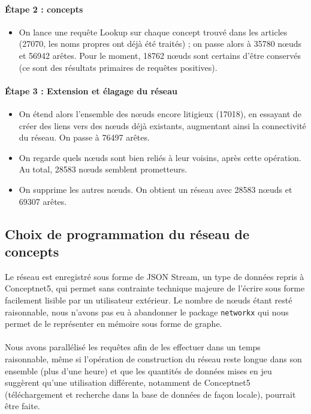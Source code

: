 \documentclass[a4paper, 12pt]{article}
\newcommand{\pyt}[1]{\texttt{#1}}%
\begin{document}
\paragraph{Étape 2 : concepts}

\begin{itemize}
 \item On lance une requête Lookup sur chaque concept trouvé dans les articles (27070, les noms propres ont déjà été traités) ; on passe alors à 35780 n\oe uds et 56942 arêtes. Pour le moment, 18762 n\oe uds sont certains d'être conservés (ce sont des résultats primaires de requêtes positives).
\end{itemize}


\paragraph{Étape 3 : Extension et élagage du réseau}

\begin{itemize}
 \item On étend alors l'ensemble des n\oe uds encore litigieux (17018), en essayant de créer des liens vers des n\oe uds déjà existants, augmentant ainsi la connectivité du réseau. On passe à 76497 arêtes.
 \item On regarde quels n\oe uds sont bien reliés à leur voisins, après cette opération. Au total, 28583 n\oe uds semblent prometteurs.
 \item On supprime les autres n\oe uds. On obtient un réseau avec 28583 n\oe uds et 69307 arêtes.
\end{itemize}



\subsection{Choix de programmation du réseau de concepts}

Le réseau est enregistré sous forme de JSON Stream, un type de données repris à Conceptnet5, qui permet sans contrainte technique majeure de l'écrire sous forme facilement lisible par un utilisateur extérieur. Le nombre de nœuds étant resté raisonnable, nous n'avons pas eu à abandonner le package \pyt{networkx} qui nous permet de le représenter en mémoire sous forme de graphe.

\paragraph{}
Nous avons parallélisé les requêtes afin de les effectuer dans un temps raisonnable, même si l'opération de construction du réseau reste longue dans son ensemble (plus d'une heure) et que les quantités de données mises en jeu suggèrent qu'une utilisation différente, notamment de Conceptnet5 (téléchargement et recherche dans la base de données de façon locale), pourrait être faite.
\end{document}
